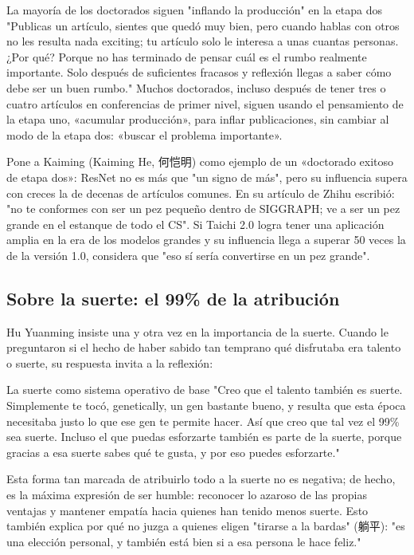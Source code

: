\begin{warningbox}{La mayoría de los doctorados siguen "inflando la producción" en la etapa dos}
"Publicas un artículo, sientes que quedó muy bien, pero cuando hablas con otros no les resulta nada exciting; tu artículo solo le interesa a unas cuantas personas. ¿Por qué? Porque no has terminado de pensar cuál es el rumbo realmente importante. Solo después de suficientes fracasos y reflexión llegas a saber cómo debe ser un buen rumbo." Muchos doctorados, incluso después de tener tres o cuatro artículos en conferencias de primer nivel, siguen usando el pensamiento de la etapa uno, «acumular producción», para inflar publicaciones, sin cambiar al modo de la etapa dos: «buscar el problema importante».
\end{warningbox}

Pone a Kaiming (Kaiming He, 何恺明) como ejemplo de un «doctorado exitoso de etapa dos»: ResNet no es más que "un signo de más", pero su influencia supera con creces la de decenas de artículos comunes. En su artículo de Zhihu escribió: "no te conformes con ser un pez pequeño dentro de SIGGRAPH; ve a ser un pez grande en el estanque de todo el CS". Si Taichi 2.0 logra tener una aplicación amplia en la era de los modelos grandes y su influencia llega a superar 50 veces la de la versión 1.0, considera que "eso sí sería convertirse en un pez grande".

\subsection{Sobre la suerte: el 99\% de la atribución}

Hu Yuanming insiste una y otra vez en la importancia de la suerte. Cuando le preguntaron si el hecho de haber sabido tan temprano qué disfrutaba era talento o suerte, su respuesta invita a la reflexión:

\begin{importantbox}{La suerte como sistema operativo de base}
"Creo que el talento también es suerte. Simplemente te tocó, genetically, un gen bastante bueno, y resulta que esta época necesitaba justo lo que ese gen te permite hacer. Así que creo que tal vez el 99\% sea suerte. Incluso el que puedas esforzarte también es parte de la suerte, porque gracias a esa suerte sabes qué te gusta, y por eso puedes esforzarte."
\end{importantbox}

Esta forma tan marcada de atribuirlo todo a la suerte no es negativa; de hecho, es la máxima expresión de ser humble: reconocer lo azaroso de las propias ventajas y mantener empatía hacia quienes han tenido menos suerte. Esto también explica por qué no juzga a quienes eligen "tirarse a la bardas" (躺平): "es una elección personal, y también está bien si a esa persona le hace feliz."

